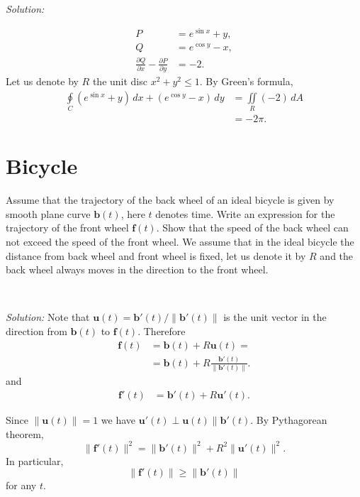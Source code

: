\documentclass{article}
\def\ge{\geqslant}%
\def\le{\leqslant}%
\begin{document}
\ 

\noindent\textit{Solution:}

\begin{align*}
P&= e^{\sin x}+y,
\\
Q&=e^{\cos y}-x,
\\
\frac{\partial Q}{\partial x}-\frac{\partial P}{\partial y}&=-2.
\end{align*}
Let us denote by $R$ the unit disc $x^2+y^2\le 1$.
By Green's formula,
\begin{align*}
\oint\limits_C (e^{\sin x}+y)\,dx+(e^{\cos y}-x)\,dy
&=
\iint\limits_R(-2)\,dA
\\
&=-2\pi.
\end{align*}









\section*{
Bicycle
}

Assume that the trajectory of the back wheel of an ideal bicycle is given by smooth plane curve $\mathbf{b}(t)$, here $t$ denotes time. Write an expression for the trajectory of the front wheel $\mathbf{f}(t)$. 
Show that the speed of the back wheel can not exceed the speed of the front wheel.
We assume that in the ideal bicycle the distance from back wheel and front wheel is fixed, let us denote it by $R$ and the back wheel always moves in the direction to the front wheel.

\ 
  

\noindent\textit{Solution:} Note that $\mathbf{u}(t)=\mathbf{b}'(t)/\|\mathbf{b}'(t)\|$ is the unit vector in the direction from $\mathbf{b}(t)$ to $\mathbf{f}(t)$.
Therefore
\begin{align*}
\mathbf{f}(t)&=\mathbf{b}(t)+R\mathbf{u}(t)=
\\
&=\mathbf{b}(t)+R\frac{\mathbf{b}'(t)}{\|\mathbf{b}'(t)\|}.
\end{align*}
and 
\begin{align*}
\mathbf{f}'(t)&=\mathbf{b}'(t)+R\mathbf{u}'(t).
\end{align*}

Since $\|\mathbf{u}(t)\|=1$ we have $\mathbf{u}'(t)\perp\mathbf{u}(t)\parallel \mathbf{b}'(t)$. By Pythagorean theorem,
\[\|\mathbf{f}'(t)\|^2=\|\mathbf{b}'(t)\|^2+R^2\|\mathbf{u}'(t)\|^2.\]
In particular, 
\[\|\mathbf{f}'(t)\|\ge \|\mathbf{b}'(t)\|\]
for any $t$.
\end{document}
